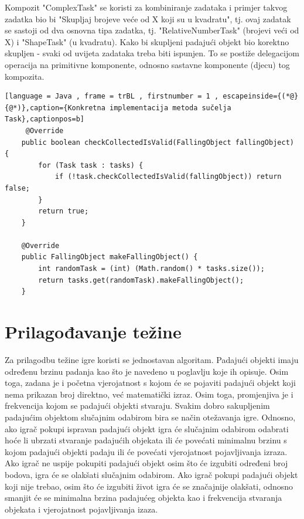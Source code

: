 \documentclass[times, utf8, zavrsni, numeric]{fer}
\begin{document}
	 Kompozit "ComplexTask" se koristi za kombiniranje zadataka i primjer takvog zadatka bio bi "Skupljaj brojeve veće od X koji su u kvadratu", tj. ovaj zadatak se sastoji od dva osnovna tipa zadatka, tj.
	 "RelativeNumberTask" (brojevi veći od X) i "ShapeTask" (u kvadratu). Kako bi skupljeni padajući objekt bio korektno skupljen - svaki od uvijeta zadataka treba biti ispunjen. To se postiže delegacijom operacija na primitivne
	 komponente, odnosno sastavne komponente (djecu) tog kompozita.
	 \renewcommand{\lstlistingname}{Kôd}
	\begin{lstlisting}[language = Java , frame = trBL , firstnumber = 1 , escapeinside={(*@}{@*)},caption={Konkretna implementacija metoda sučelja Task},captionpos=b]
	 @Override
    public boolean checkCollectedIsValid(FallingObject fallingObject) {
        for (Task task : tasks) {
            if (!task.checkCollectedIsValid(fallingObject)) return false;
        }
        return true;
    }

    @Override
    public FallingObject makeFallingObject() {
        int randomTask = (int) (Math.random() * tasks.size());
        return tasks.get(randomTask).makeFallingObject();
    }
	\end{lstlisting}
	
	\section{Prilagođavanje težine}
	Za prilagodbu težine igre koristi se jednostavan algoritam. Padajući objekti imaju određenu brzinu padanja kao što je navedeno u poglavlju koje ih opisuje. Osim toga, zadana je i početna vjerojatnost 
	s kojom će se pojaviti padajući objekt koji nema prikazan broj direktno, već matematički izraz. Osim toga, promjenjiva je i frekvencija kojom se padajući objekti stvaraju. Svakim dobro sakupljenim padajućim objektom
	slučajnim odabirom bira se način otežavanja igre. Odnosno, ako igrač pokupi ispravan padajući objekt igra će slučajnim odabirom odabrati hoće li ubrzati stvaranje padajućih objekata ili će povećati minimalnu brzinu
	s kojom padajući objekti padaju ili će povećati vjerojatnost pojavljivanja izraza.
	Ako igrač ne uspije pokupiti padajući objekt osim što će izgubiti određeni broj bodova, igra će se olakšati slučajnim odabirom. Ako igrač pokupi padajući objekt koji nije trebao, osim što će
	izgubiti život igra će se značajnije olakšati, odnosno smanjit će se minimalna brzina padajućeg objekta kao i frekvencija stvaranja objekata i vjerojatnost pojavljivanja izaza.
	
\end{document}
